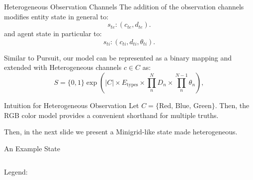 \begin{frame}{Heterogeneous Observation Channels}
    The addition of the observation channels modifies
    entity state in general to:
    \[s_{te} :(c_{te},d_{te}).\]
    and agent state in particular to:
    \[s_{ti} :(c_{ti},d_{ti},\theta_{ti}).\]

    Similar to Pursuit, our model can be represented as a binary mapping
    and extended with Heterogeneous channels \(c\in C\) as:
    \[
        S = \{0,1\}\exp\left(|C|\times E_\text{types}
        \times \prod_{n}^{N} D_n \times \prod_{n}^{N-1} \theta_n\right),
    \]
\end{frame}

\begin{frame}{Intuition for Heterogeneous Observation}
    Let \(C = \{\text{Red, Blue, Green}\}\).
    Then, the RGB color model 
    provides a convenient shorthand for multiple truths. \\
   \begin{figure}
        \centering
        
    \end{figure}
    Then, in the next slide we present a Minigrid-like state made heterogeneous.
\end{frame}

\begin{frame}{An Example State}
    \begin{columns}
        \begin{column}{0.4\linewidth}
            Legend:
            \begin{figure}
                \resizebox{!}{0.5\linewidth}{%
                    
                }
            \end{figure}
        \end{column}
        \begin{column}{0.6\linewidth}
            \begin{figure}
                \resizebox{\linewidth}{!}{%
                    
                }
            \end{figure}
        \end{column}
    \end{columns}
\end{frame}

